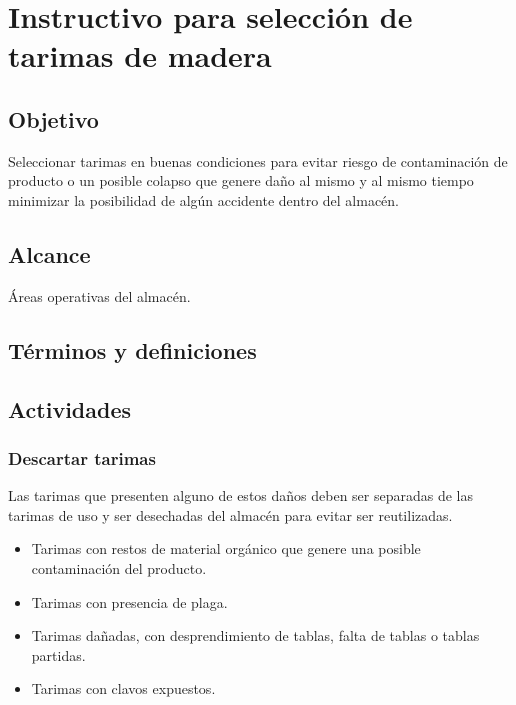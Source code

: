 \thispagestyle{formato-PI}
\renewcommand{\MayorVer}{2}
\renewcommand{\MenorVer}{0}
\renewcommand{\FechaPub}{2023--01}
\renewcommand{\TipoID}{IT}
\renewcommand{\Titulo}{Instructivo para selección de tarimas de madera}

\section{\Titulo}
\renewcommand{\Codigo}{\Prog--\thesection--\TipoID}

\subsection{Objetivo}

Seleccionar tarimas en buenas condiciones para evitar riesgo de contaminación de producto o un posible colapso que genere daño al mismo y al mismo tiempo minimizar la posibilidad de algún accidente dentro del almacén.

\subsection{Alcance}

Áreas operativas del almacén.

\subsection{Términos y definiciones}

\subsection{Actividades}
\subsubsection{Descartar tarimas}
Las tarimas que presenten alguno de estos daños deben ser separadas de las tarimas de uso y ser desechadas del almacén para evitar ser reutilizadas.

\begin{itemize}
	\item Tarimas con restos de material orgánico que genere una posible contaminación del producto.
	\item Tarimas con presencia de plaga.
	\item Tarimas dañadas, con desprendimiento de tablas, falta de tablas o tablas partidas.
	\item Tarimas con clavos expuestos.
\end{itemize}

